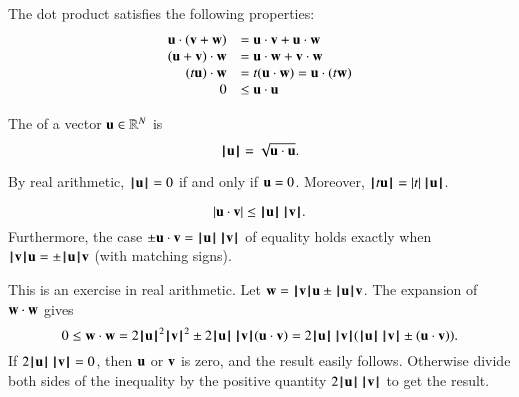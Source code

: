 The dot product satisfies the following
properties:
\begin{equation}\label{eqn:dot}
\begin{array}{rll}
\u \cdot (\v + \w) &= \u \cdot \v + \u \cdot \w\\
(\u + \v)\cdot \w &= \u \cdot \w + \v \cdot \w\\
(t \u)\cdot \w &= t(\u \cdot \w) = \u \cdot (t \w)\\
0 &\le \u\cdot \u\\
\end{array}
\end{equation}

\begin{definition}[norm]
\label{def:norm}
The  of a vector $\u\in\ring{R}^N$ is
\begin{displaymath}\normo{\u} = \sqrt{\u\cdot \u}.\end{displaymath}
%
\end{definition}

By  real arithmetic,
$\normo{\u}=0$  if and only if $\u=0$.  Moreover,
$\normo{ t \u } = |t| \, \normo{\u}$.   



\begin{lemma}
  \begin{displaymath}|\u \cdot \v| \le
    \normo{\u}\,\normo{\v}.\end{displaymath} Furthermore, the case
  $\pm \u\cdot \v = \normo{\u}\,\normo{\v}$ of equality holds exactly
  when $\normo{\v} \u = \pm\normo{\u} \v$ (with matching signs).
\end{lemma}
%

\begin{proved}
  This is an exercise in real arithmetic.  Let $\w = \normo{\v} \u \pm
  \normo{\u} \v$.  The expansion of $\w\cdot \w$ gives
  \begin{displaymath}0\le \w\cdot \w = 2\normo{\u}^2\normo{\v}^2 \pm
    2\normo{\u}\, \normo{\v} (\u\cdot \v) = 2\normo{\u}\, \normo{\v}
    (\normo{\u}\, \normo{\v} \pm (\u \cdot \v)).\end{displaymath} If
  $2\normo{\u} \,\normo{\v} = 0$, then $\u$ or $\v$ is zero, and the
  result easily follows.  Otherwise divide both sides of the
  inequality by the positive quantity $2 \normo{\u} \,\normo{\v}$ to
  get the result.  \swallowed\end{proved}

